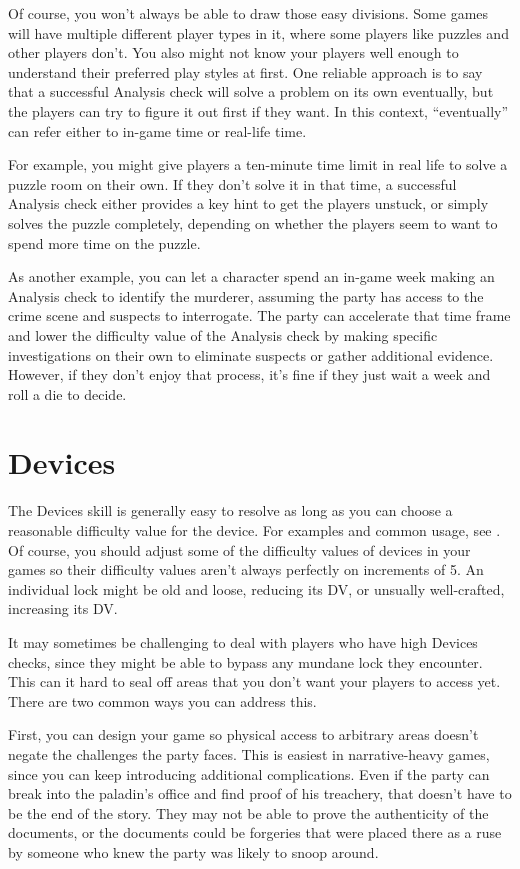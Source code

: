   Of course, you won't always be able to draw those easy divisions.
  Some games will have multiple different player types in it, where some players like puzzles and other players don't.
  You also might not know your players well enough to understand their preferred play styles at first.
  One reliable approach is to say that a successful Analysis check will solve a problem on its own eventually, but the players can try to figure it out first if they want.
  In this context, ``eventually'' can refer either to in-game time or real-life time.

  For example, you might give players a ten-minute time limit in real life to solve a puzzle room on their own.
  If they don't solve it in that time, a successful Analysis check either provides a key hint to get the players unstuck, or simply solves the puzzle completely, depending on whether the players seem to want to spend more time on the puzzle.

  As another example, you can let a character spend an in-game week making an Analysis check to identify the murderer, assuming the party has access to the crime scene and suspects to interrogate.
  The party can accelerate that time frame and lower the difficulty value of the Analysis check by making specific investigations on their own to eliminate suspects or gather additional evidence.
  However, if they don't enjoy that process, it's fine if they just wait a week and roll a die to decide.

\section{Devices}

  The Devices skill is generally easy to resolve as long as you can choose a reasonable difficulty value for the device.
  For examples and common usage, see .
  Of course, you should adjust some of the difficulty values of devices in your games so their difficulty values aren't always perfectly on increments of 5.
  An individual lock might be old and loose, reducing its DV, or unsually well-crafted, increasing its DV.

  It may sometimes be challenging to deal with players who have high Devices checks, since they might be able to bypass any mundane lock they encounter.
  This can it hard to seal off areas that you don't want your players to access yet.
  There are two common ways you can address this.

  First, you can design your game so physical access to arbitrary areas doesn't negate the challenges the party faces.
  This is easiest in narrative-heavy games, since you can keep introducing additional complications.
  Even if the party can break into the paladin's office and find proof of his treachery, that doesn't have to be the end of the story.
  They may not be able to prove the authenticity of the documents, or the documents could be forgeries that were placed there as a ruse by someone who knew the party was likely to snoop around.

